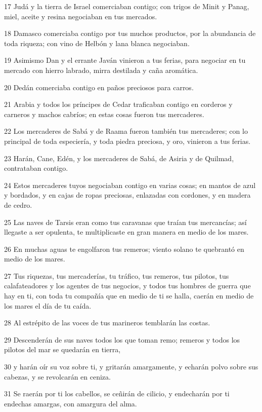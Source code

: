 \par 17 Judá y la tierra de Israel comerciaban contigo; con trigos de Minit y Panag, miel, aceite y resina negociaban en tus mercados.
\par 18 Damasco comerciaba contigo por tus muchos productos, por la abundancia de toda riqueza; con vino de Helbón y lana blanca negociaban.
\par 19 Asimismo Dan y el errante Javán vinieron a tus ferias, para negociar en tu mercado con hierro labrado, mirra destilada y caña aromática.
\par 20 Dedán comerciaba contigo en paños preciosos para carros.
\par 21 Arabia y todos los príncipes de Cedar traficaban contigo en corderos y carneros y machos cabríos; en estas cosas fueron tus mercaderes.
\par 22 Los mercaderes de Sabá y de Raama fueron también tus mercaderes; con lo principal de toda especiería, y toda piedra preciosa, y oro, vinieron a tus ferias.
\par 23 Harán, Cane, Edén, y los mercaderes de Sabá, de Asiria y de Quilmad, contrataban contigo.
\par 24 Estos mercaderes tuyos negociaban contigo en varias cosas; en mantos de azul y bordados, y en cajas de ropas preciosas, enlazadas con cordones, y en madera de cedro.
\par 25 Las naves de Tarsis eran como tus caravanas que traían tus mercancías; así llegaste a ser opulenta, te multiplicaste en gran manera en medio de los mares.
\par 26 En muchas aguas te engolfaron tus remeros; viento solano te quebrantó en medio de los mares.
\par 27 Tus riquezas, tus mercaderías, tu tráfico, tus remeros, tus pilotos, tus calafateadores y los agentes de tus negocios, y todos tus hombres de guerra que hay en ti, con toda tu compañía que en medio de ti se halla, caerán en medio de los mares el día de tu caída.
\par 28 Al estrépito de las voces de tus marineros temblarán las costas.
\par 29 Descenderán de sus naves todos los que toman remo; remeros y todos los pilotos del mar se quedarán en tierra,
\par 30 y harán oír su voz sobre ti, y gritarán amargamente, y echarán polvo sobre sus cabezas, y se revolcarán en ceniza.
\par 31 Se raerán por ti los cabellos, se ceñirán de cilicio, y endecharán por ti endechas amargas, con amargura del alma.
